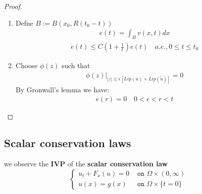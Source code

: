 \begin{proof}
\begin{enumerate}
	\item Defne $B:= B(x_0, R(t_0 - t))$
	\begin{align*}
		e(t) = \int_B v(x, t) dx 
	\end{align*}
	\begin{align*}
		\dot{e}(t) \le C (1 + \frac{1}{t})e(t) \quad a.e. , 0 \le t \le t_0
	\end{align*}
	\item Choose $\phi(z)$ such that 
	\begin{align*}
		\phi(z) |_{|z| \le \epsilon [Lip(u) + Lip(\tilde{u})]} = 0
	\end{align*} 
	By Gronwall's lemma we have:
	\begin{align*}
		e(r) = 0 \quad 0< \epsilon < r < t
	\end{align*}
\end{enumerate}
\end{proof}

\subsection{Scalar conservation laws}
we observe the \textbf{IVP} of the \textbf{scalar conservation law}
\begin{equation*}
\left\{
\begin{aligned}
	u_t + F_x(u) = 0 &\texttt{ on } \Omega \times (0, \infty) \\
	u(x) = g(x) &\texttt{ on } \Omega \times \{t = 0\}
\end{aligned}
\right.
\end{equation*}
